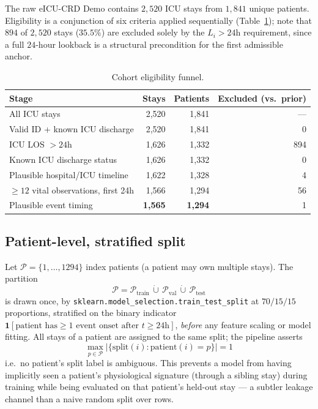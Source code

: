 \documentclass[11pt]{article}
\newcommand{\1}[1]{\mathbf{1}\!\left[#1\right]}
\begin{document}
The raw eICU-CRD Demo contains $2{,}520$ ICU stays from $1{,}841$ unique patients. Eligibility is a conjunction of six criteria applied sequentially (Table~\ref{tab:funnel}); note that $894$ of $2{,}520$ stays ($35.5\%$) are excluded solely by the $L_i > 24$h requirement, since a full $24$-hour lookback is a structural precondition for the first admissible anchor.

\begin{table}[h]
\centering
\caption{Cohort eligibility funnel.}
\label{tab:funnel}
\begin{tabular}{lrrr}
\toprule
Stage & Stays & Patients & Excluded (vs.\ prior) \\
\midrule
All ICU stays & 2{,}520 & 1{,}841 & --- \\
Valid ID + known ICU discharge & 2{,}520 & 1{,}841 & 0 \\
ICU LOS $> 24$h & 1{,}626 & 1{,}332 & 894 \\
Known ICU discharge status & 1{,}626 & 1{,}332 & 0 \\
Plausible hospital/ICU timeline & 1{,}622 & 1{,}328 & 4 \\
$\ge 12$ vital observations, first 24h & 1{,}566 & 1{,}294 & 56 \\
Plausible event timing & \textbf{1{,}565} & \textbf{1{,}294} & 1 \\
\bottomrule
\end{tabular}
\end{table}

\subsection{Patient-level, stratified split}

Let $\mathcal{P}=\{1,\dots,1294\}$ index patients (a patient may own multiple stays). The partition
\[
\mathcal{P} = \mathcal{P}_{\mathrm{train}} \,\dot\cup\, \mathcal{P}_{\mathrm{val}} \,\dot\cup\, \mathcal{P}_{\mathrm{test}}
\]
is drawn once, by \texttt{sklearn.model\_selection.train\_test\_split} at $70/15/15$ proportions, stratified on the binary indicator $\1{\text{patient has} \ge 1 \text{ event onset after } t\ge 24\text{h}}$, \emph{before} any feature scaling or model fitting. All stays of a patient are assigned to the same split; the pipeline asserts
\[
\max_{p\in\mathcal{P}} \big|\{\text{split}(i) : \mathrm{patient}(i)=p\}\big| = 1
\]
i.e.\ no patient's split label is ambiguous. This prevents a model from having implicitly seen a patient's physiological signature (through a sibling stay) during training while being evaluated on that patient's held-out stay — a subtler leakage channel than a naive random split over rows.
\end{document}
